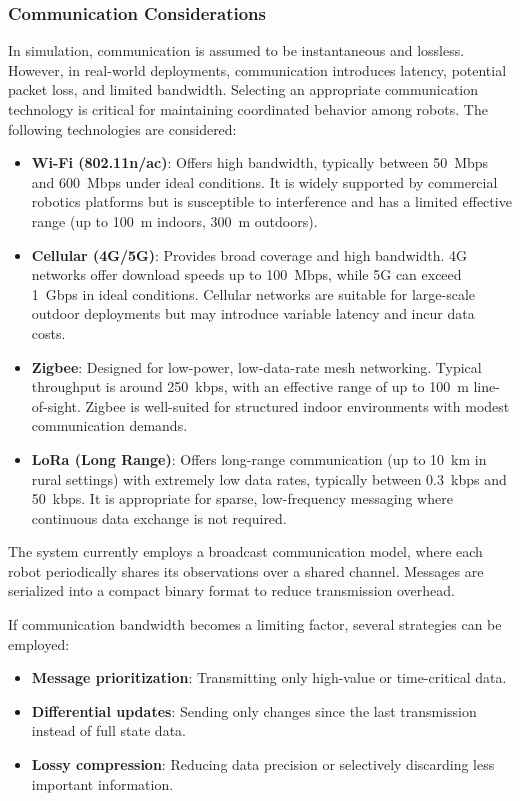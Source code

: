 \subsubsection{Communication Considerations}
\label{sub:communication-methods}

In simulation, communication is assumed to be instantaneous and lossless. However, in real-world deployments, communication introduces latency, potential packet loss, and limited bandwidth. Selecting an appropriate communication technology is critical for maintaining coordinated behavior among robots. The following technologies are considered:

\begin{itemize}
  \item \textbf{Wi-Fi (802.11n/ac)}: Offers high bandwidth, typically between \SI{50}{Mbps} and \SI{600}{Mbps} under ideal conditions. It is widely supported by commercial robotics platforms but is susceptible to interference and has a limited effective range (up to \SI{100}{m} indoors, \SI{300}{m} outdoors).
  \item \textbf{Cellular (4G/5G)}: Provides broad coverage and high bandwidth. 4G networks offer download speeds up to \SI{100}{Mbps}, while 5G can exceed \SI{1}{Gbps} in ideal conditions. Cellular networks are suitable for large-scale outdoor deployments but may introduce variable latency and incur data costs.
  \item \textbf{Zigbee}: Designed for low-power, low-data-rate mesh networking. Typical throughput is around \SI{250}{kbps}, with an effective range of up to \SI{100}{m} line-of-sight. Zigbee is well-suited for structured indoor environments with modest communication demands.
  \item \textbf{LoRa (Long Range)}: Offers long-range communication (up to \SI{10}{km} in rural settings) with extremely low data rates, typically between \SI{0.3}{kbps} and \SI{50}{kbps}. It is appropriate for sparse, low-frequency messaging where continuous data exchange is not required.
\end{itemize}

The system currently employs a broadcast communication model, where each robot periodically shares its observations over a shared channel. Messages are serialized into a compact binary format to reduce transmission overhead.

If communication bandwidth becomes a limiting factor, several strategies can be employed:
\begin{itemize}
  \item \textbf{Message prioritization}: Transmitting only high-value or time-critical data.
  \item \textbf{Differential updates}: Sending only changes since the last transmission instead of full state data.
  \item \textbf{Lossy compression}: Reducing data precision or selectively discarding less important information.
\end{itemize}

